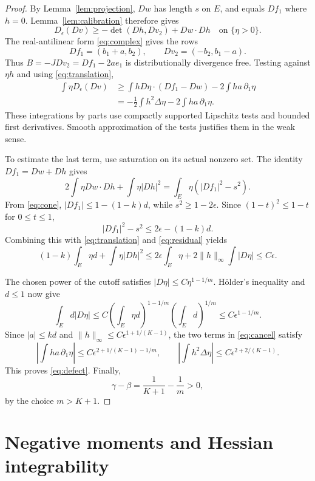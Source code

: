 \documentclass[11pt]{article}
\theoremstyle{remark}
\numberwithin{equation}{section}
\begin{document}
\begin{proof}
By Lemma~\ref{lem:projection}, \(Dw\) has length \(s\) on \(E\),
and equals \(Df_1\) where \(h=0\). Lemma~\ref{lem:calibration} therefore gives
\[
D_\epsilon(Dv)\ge-\det(Dh,Dv_2)+Dw\cdot Dh
\quad\text{on }\{\eta>0\}.
\]
The real-antilinear form \eqref{eq:complex} gives the rows
\[
Df_1=(b_1+a,b_2),\qquad Dv_2=(-b_2,b_1-a).
\]
Thus \(B=-JDv_2=Df_1-2ae_1\) is distributionally divergence free.
Testing against \(\eta h\) and using \eqref{eq:translation},
\begin{equation}
\begin{aligned}
\int\eta D_\epsilon(Dv)
&\ge \int hD\eta\cdot(Df_1-Dw)-2\int ha\,\partial_1\eta\\
&=-\frac12\int h^2\Delta\eta-2\int ha\,\partial_1\eta.
\end{aligned}
\label{eq:cancel}
\end{equation}
These integrations by parts use compactly supported Lipschitz tests and
bounded first derivatives. Smooth approximation of the tests justifies
them in the weak sense.

To estimate the last term, use saturation on its actual nonzero set.
The identity \(Df_1=Dw+Dh\) gives
\[
2\int\eta Dw\cdot Dh+\int\eta|Dh|^2
=\int_E\eta(|Df_1|^2-s^2).
\]
From \eqref{eq:cone}, \(|Df_1|\le1-(1-k)d\), while \(s^2\ge1-2\epsilon\).
Since \((1-t)^2\le1-t\) for \(0\le t\le1\),
\[
|Df_1|^2-s^2\le2\epsilon-(1-k)d.
\]
Combining this with \eqref{eq:translation} and \eqref{eq:residual} yields
\begin{equation}\label{eq:energy}
(1-k)\int_E\eta d+\int\eta|Dh|^2
\le2\epsilon\int_E\eta+2\|h\|_\infty\int|D\eta|
\le C\epsilon.
\end{equation}

The chosen power of the cutoff satisfies
\(|D\eta|\le C\eta^{1-1/m}\).
H\"older's inequality and \(d\le1\) now give
\[
\int_Ed|D\eta|
\le C\left(\int_E\eta d\right)^{1-1/m}
       \left(\int_Ed\right)^{1/m}
\le C\epsilon^{1-1/m}.
\]
Since \(|a|\le kd\) and \(\|h\|_\infty\le C\epsilon^{1+1/(K-1)}\),
the two terms in \eqref{eq:cancel} satisfy
\[
\left|\int ha\,\partial_1\eta\right|
\le C\epsilon^{2+1/(K-1)-1/m},
\qquad
\left|\int h^2\Delta\eta\right|
\le C\epsilon^{2+2/(K-1)}.
\]
This proves \eqref{eq:defect}. Finally,
\[
\gamma-\beta=\frac1{K+1}-\frac1m>0,
\]
by the choice \(m>K+1\).
\end{proof}

\section{Negative moments and Hessian integrability}\label{sec:moments}
\end{document}
